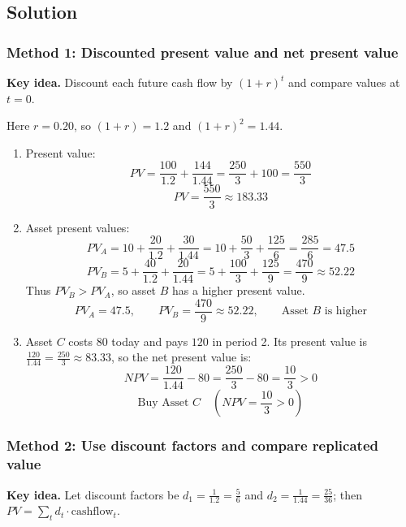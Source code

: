 \documentclass[12pt]{article}
\begin{document}
\subsection*{Solution}

\subsubsection*{Method 1: Discounted present value and net present value}
\noindent\textbf{Key idea.} Discount each future cash flow by $(1+r)^t$ and compare values at $t=0$.

Here $r=0.20$, so $(1+r)=1.2$ and $(1+r)^2=1.44$.

\begin{enumerate}[label=(\alph*)]
\item Present value:
$$PV = \frac{100}{1.2} + \frac{144}{1.44} = \frac{250}{3} + 100 = \frac{550}{3}$$
$$\boxed{PV = \frac{550}{3} \approx 183.33}$$

\item Asset present values:
$$PV_A = 10+\frac{20}{1.2}+\frac{30}{1.44} = 10+\frac{50}{3}+\frac{125}{6} = \frac{285}{6} = 47.5$$
$$PV_B = 5+\frac{40}{1.2}+\frac{20}{1.44} = 5+\frac{100}{3}+\frac{125}{9} = \frac{470}{9} \approx 52.22$$
Thus $PV_B > PV_A$, so asset $B$ has a higher present value.
$$\boxed{PV_A = 47.5, \qquad PV_B = \frac{470}{9} \approx 52.22, \qquad \text{Asset } B \text{ is higher}}$$

\item Asset $C$ costs $80$ today and pays $120$ in period 2.
Its present value is $\frac{120}{1.44} = \frac{250}{3} \approx 83.33$, so the net present value is:
$$NPV = \frac{120}{1.44} - 80 = \frac{250}{3} - 80 = \frac{10}{3} > 0$$
$$\boxed{\text{Buy Asset } C \quad \left(NPV = \frac{10}{3} > 0\right)}$$
\end{enumerate}

\subsubsection*{Method 2: Use discount factors and compare replicated value}
\noindent\textbf{Key idea.} Let discount factors be $d_1=\frac{1}{1.2}=\frac{5}{6}$ and $d_2=\frac{1}{1.44}=\frac{25}{36}$; then $PV=\sum_t d_t \cdot \text{cashflow}_t$.
\end{document}

